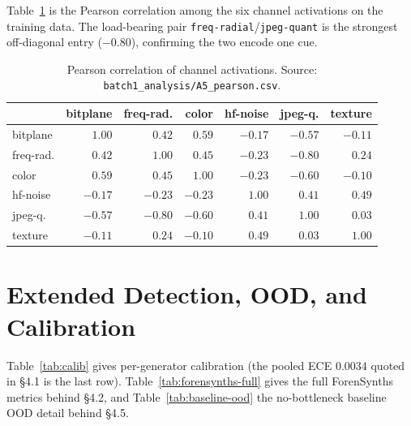 Table~\ref{tab:corr} is the Pearson correlation among the six channel activations on the
training data. The load-bearing pair \texttt{freq-radial}/\texttt{jpeg-quant} is the
strongest off-diagonal entry ($-0.80$), confirming the two encode one cue.

\begin{table}[h]
  \centering
  \caption{Pearson correlation of channel activations. Source:
    \texttt{batch1\_analysis/A5\_pearson.csv}.}
  \label{tab:corr}
  \small
  \begin{tabular}{lrrrrrr}
    \toprule
     & bitplane & freq-rad. & color & hf-noise & jpeg-q. & texture \\
    \midrule
    bitplane  & $1.00$  & $0.42$  & $0.59$  & $-0.17$ & $-0.57$ & $-0.11$ \\
    freq-rad. & $0.42$  & $1.00$  & $0.45$  & $-0.23$ & $\mathbf{-0.80}$ & $0.24$ \\
    color     & $0.59$  & $0.45$  & $1.00$  & $-0.23$ & $-0.60$ & $-0.10$ \\
    hf-noise  & $-0.17$ & $-0.23$ & $-0.23$ & $1.00$  & $0.41$  & $0.49$ \\
    jpeg-q.   & $-0.57$ & $\mathbf{-0.80}$ & $-0.60$ & $0.41$  & $1.00$  & $0.03$ \\
    texture   & $-0.11$ & $0.24$  & $-0.10$ & $0.49$  & $0.03$  & $1.00$ \\
    \bottomrule
  \end{tabular}
\end{table}

\section{Extended Detection, OOD, and Calibration}
\label{app:ext}

Table~\ref{tab:calib} gives per-generator calibration (the pooled ECE 0.0034 quoted in
\S{}4.1 is the last row). Table~\ref{tab:forensynths-full} gives the full ForenSynths
metrics behind \S{}4.2, and Table~\ref{tab:baseline-ood} the no-bottleneck baseline OOD
detail behind \S{}4.5.

